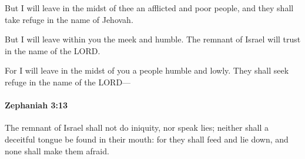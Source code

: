 			\begin{versebox}
					\item[BHS] 
					\item[LXX] 
					\item[ASV] But I will leave in the midst of thee an afflicted and poor people, and they shall take refuge in the name of Jehovah.
					\item[NIV] But I will leave within you the meek and humble. The remnant of Israel will trust in the name of the LORD.
					\item[NRSV] For I will leave in the midst of you a people humble and lowly. They shall seek refuge in the name of the LORD—
			\end{versebox}

		\paragraph{Zephaniah 3:13} %
			\label{ZEPHANIAH-3-13}

			The remnant of Israel shall not do iniquity, nor speak lies; neither shall a deceitful tongue be found in their mouth: for they shall feed and lie down, and none shall make them afraid.

